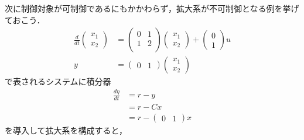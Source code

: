 次に制御対象が可制御であるにもかかわらず，拡大系が不可制御となる例を挙げておこう．
\begin{align}
 \frac{d}{dt}
 \left(
 \begin{array}{c}
  x_1 \\
  x_2
 \end{array}
 \right) &=
 \left(
 \begin{array}{cc}
  0 & 1 \\
  1 & 2 \\
 \end{array}
 \right)
 \left(
 \begin{array}{c}
  x_1 \\
  x_2
 \end{array}
 \right) +
 \left(
 \begin{array}{c}
  0 \\
  1
 \end{array}
 \right) u \\
 y &= 
 \left(
 \begin{array}{cc}
  0 & 1
 \end{array}
 \right)
 \left(
 \begin{array}{c}
  x_1 \\
  x_2
 \end{array}
 \right)
\end{align}
で表されるシステムに積分器
\begin{align}
 \frac{d\eta}{dt} &= r - y \\
 &= r - Cx \\
 &= r - \left(\begin{array}{cc}0 & 1\end{array}\right)x
\end{align}
を導入して拡大系を構成すると，
